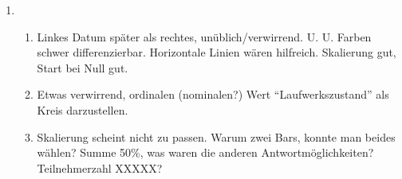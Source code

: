 \documentclass{article}
\begin{document}
\begin{enumerate}
    \item \begin{enumerate}
        \item Linkes Datum später als rechtes, unüblich/verwirrend. U. U. Farben schwer differenzierbar. Horizontale Linien wären hilfreich. Skalierung gut, Start bei Null gut.
        \item Etwas verwirrend, ordinalen (nominalen?) Wert \enquote{Laufwerkszustand} als Kreis darzustellen.
        \item Skalierung scheint nicht zu passen. Warum zwei Bars, konnte man beides wählen? Summe 50\%, was waren die anderen Antwortmöglichkeiten? Teilnehmerzahl XXXXX? 
    \end{enumerate}
\end{enumerate}
\end{document}
